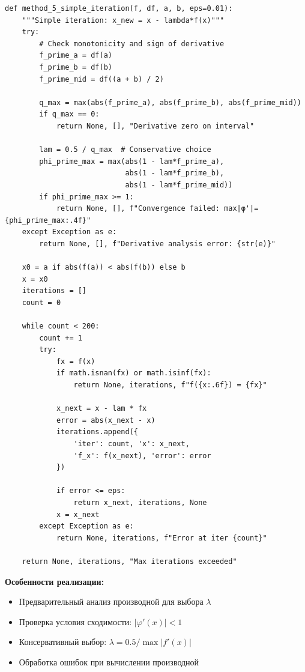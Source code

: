 \documentclass[a4paper,12pt]{article}
\begin{document}
\begin{lstlisting}[style=intellij,caption={method\_5\_simple\_iteration()},basicstyle=\ttfamily\small\color{intj-id}]
def method_5_simple_iteration(f, df, a, b, eps=0.01):
    """Simple iteration: x_new = x - lambda*f(x)"""
    try:
        # Check monotonicity and sign of derivative
        f_prime_a = df(a)
        f_prime_b = df(b)
        f_prime_mid = df((a + b) / 2)
        
        q_max = max(abs(f_prime_a), abs(f_prime_b), abs(f_prime_mid))
        if q_max == 0:
            return None, [], "Derivative zero on interval"
        
        lam = 0.5 / q_max  # Conservative choice
        phi_prime_max = max(abs(1 - lam*f_prime_a),
                            abs(1 - lam*f_prime_b),
                            abs(1 - lam*f_prime_mid))
        if phi_prime_max >= 1:
            return None, [], f"Convergence failed: max|φ'|={phi_prime_max:.4f}"
    except Exception as e:
        return None, [], f"Derivative analysis error: {str(e)}"
    
    x0 = a if abs(f(a)) < abs(f(b)) else b
    x = x0
    iterations = []
    count = 0
    
    while count < 200:
        count += 1
        try:
            fx = f(x)
            if math.isnan(fx) or math.isinf(fx):
                return None, iterations, f"f({x:.6f}) = {fx}"
            
            x_next = x - lam * fx
            error = abs(x_next - x)
            iterations.append({
                'iter': count, 'x': x_next,
                'f_x': f(x_next), 'error': error
            })
            
            if error <= eps:
                return x_next, iterations, None
            x = x_next
        except Exception as e:
            return None, iterations, f"Error at iter {count}"
    
    return None, iterations, "Max iterations exceeded"
\end{lstlisting}

\textbf{Особенности реализации:}
\begin{itemize}
    \item Предварительный анализ производной для выбора $\lambda$
    \item Проверка условия сходимости: $|\varphi'(x)| < 1$
    \item Консервативный выбор: $\lambda = 0.5 / \max|f'(x)|$
    \item Обработка ошибок при вычислении производной
\end{itemize}
\end{document}
